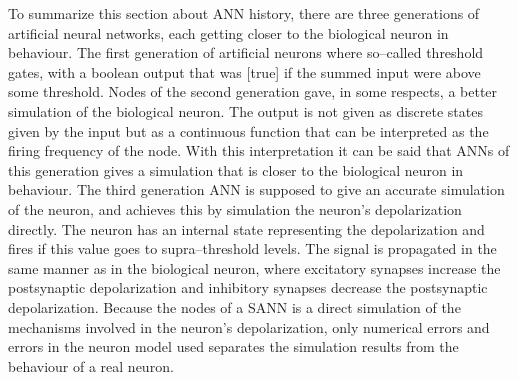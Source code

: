 	To summarize this section about ANN history, there are three generations of artificial neural networks, each getting closer to the biological neuron in behaviour.
	The first generation of artificial neurons where so--called threshold gates, with a boolean output that was [true] if the summed input were above some threshold. %
	Nodes of the second generation gave, in some respects, a better simulation of the biological neuron.
	The output is not given as discrete states given by the input but as a continuous function that can be interpreted as the firing frequency of the node. %
	With this interpretation it can be said that ANNs of this generation gives a simulation that is closer to the biological neuron in behaviour.
	The third generation ANN is supposed to give an accurate simulation of the neuron, and achieves this by simulation the neuron's depolarization directly. 
	The neuron has an internal state representing the depolarization and fires if this value goes to supra--threshold levels.
	The signal is propagated in the same manner as in the biological neuron, where excitatory synapses increase the postsynaptic depolarization and inhibitory synapses decrease the postsynaptic depolarization.
	Because the nodes of a SANN is a direct simulation of the mechanisms involved in the neuron's depolarization, only numerical errors and errors in the neuron model used separates the simulation results from the behaviour of a real neuron.






